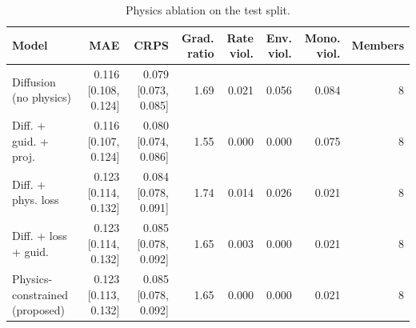 \begin{table}[t]
\centering
\caption{Physics ablation on the test split.}
\label{tab:ablation}
\scriptsize
\begin{tabular}{lrrrrrrr}
\hline
Model & MAE & CRPS & Grad. ratio & Rate viol. & Env. viol. & Mono. viol. & Members \\
\hline
Diffusion (no physics) & 0.116 [0.108, 0.124] & 0.079 [0.073, 0.085] & 1.69 & 0.021 & 0.056 & 0.084 & 8 \\
Diff. + guid. + proj. & 0.116 [0.107, 0.124] & 0.080 [0.074, 0.086] & 1.55 & 0.000 & 0.000 & 0.075 & 8 \\
Diff. + phys. loss & 0.123 [0.114, 0.132] & 0.084 [0.078, 0.091] & 1.74 & 0.014 & 0.026 & 0.021 & 8 \\
Diff. + loss + guid. & 0.123 [0.114, 0.132] & 0.085 [0.078, 0.092] & 1.65 & 0.003 & 0.000 & 0.021 & 8 \\
Physics-constrained (proposed) & 0.123 [0.113, 0.132] & 0.085 [0.078, 0.092] & 1.65 & 0.000 & 0.000 & 0.021 & 8 \\
\hline
\end{tabular}
\end{table}
